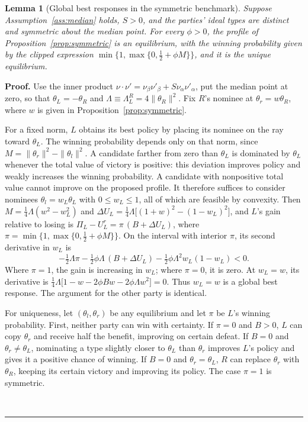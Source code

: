 \documentclass[12pt,letterpaper]{article}
\newtheorem{lemma}{Lemma}
\newenvironment{proof}[1][Proof]{\noindent\textbf{#1.} }{\ \rule{0.5em}{0.5em}}
\begin{document}
\begin{lemma}[Global best responses in the symmetric benchmark]\label{lem:global}
Suppose Assumption~\ref{ass:median} holds, $S>0$, and the parties' ideal types are distinct and symmetric about the median point. For every $\phi>0$, the profile of Proposition~\ref{prop:symmetric} is an equilibrium, with the winning probability given by the clipped expression $\min\{1,\max\{0,\tfrac12+\phi M\}\}$, and it is the unique equilibrium.
\end{lemma}

\begin{proof}
Use the inner product $\nu\cdot\nu'=\nu_\beta\nu'_\beta+S\nu_\alpha\nu'_\alpha$, put the median point at zero, so that $\theta_L=-\theta_R$ and $\Lambda\equiv\Lambda_L^R=4\|\theta_R\|^2$. Fix $R$'s nominee at $\theta_r=w\theta_R$, where $w$ is given in Proposition~\ref{prop:symmetric}.

For a fixed norm, $L$ obtains its best policy by placing its nominee on the ray toward $\theta_L$. The winning probability depends only on that norm, since $M=\|\theta_r\|^2-\|\theta_l\|^2$. A candidate farther from zero than $\theta_L$ is dominated by $\theta_L$ whenever the total value of victory is positive: this deviation improves policy and weakly increases the winning probability. A candidate with nonpositive total value cannot improve on the proposed profile. It therefore suffices to consider nominees $\theta_l=w_L\theta_L$ with $0\le w_L\le1$, all of which are feasible by convexity. Then $M=\tfrac14\Lambda(w^2-w_L^2)$ and $\Delta U_L=\tfrac14\Lambda\big[(1+w)^2-(1-w_L)^2\big]$, and $L$'s gain relative to losing is $\Pi_L-U_L^r=\pi\,(B+\Delta U_L)$, where $\pi=\min\{1,\max\{0,\tfrac12+\phi M\}\}$. On the interval with interior $\pi$, its second derivative in $w_L$ is
\[
-\tfrac12\Lambda\pi-\tfrac12\phi\Lambda\,(B+\Delta U_L)-\tfrac12\phi\Lambda^2w_L(1-w_L)<0.
\]
Where $\pi=1$, the gain is increasing in $w_L$; where $\pi=0$, it is zero. At $w_L=w$, its derivative is $\tfrac14\Lambda\big[1-w-2\phi Bw-2\phi\Lambda w^2\big]=0$. Thus $w_L=w$ is a global best response. The argument for the other party is identical.

For uniqueness, let $(\theta_l,\theta_r)$ be any equilibrium and let $\pi$ be $L$'s winning probability. First, neither party can win with certainty. If $\pi=0$ and $B>0$, $L$ can copy $\theta_r$ and receive half the benefit, improving on certain defeat. If $B=0$ and $\theta_r\ne\theta_L$, nominating a type slightly closer to $\theta_L$ than $\theta_r$ improves $L$'s policy and gives it a positive chance of winning. If $B=0$ and $\theta_r=\theta_L$, $R$ can replace $\theta_r$ with $\theta_R$, keeping its certain victory and improving its policy. The case $\pi=1$ is symmetric.


\end{proof}
\end{document}
